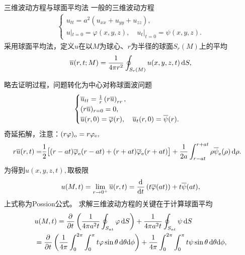 \begin{example}{三维波动方程与球面平均法}{}
	一般的三维波动方程
	\begin{align*}
		\begin{cases}
			u_{tt}=a^2(u_{xx}+u_{yy}+u_{zz}),                     \\
			u|_{t=0}=\varphi(x,y,z),\quad u_t|_{t=0}=\psi(x,y,z).
		\end{cases}
	\end{align*}
	采用球面平均法，定义$u$在以$M$为球心、$r$为半径的球面$S_r(M)$上的平均
	\[
		\overline u(r,t;M)=\frac1{4\pi r^2}\oint_{S_r(M)}u(x,y,z,t)\mathop{}\!\mathrm{d} S,
	\]
	
	略去证明过程，问题转化为中心对称球面波问题
	\begin{align*}
		\begin{cases}
			\overline u_{tt}=\frac1r\left(r\overline u\right)_{rr},                                \\
			(r\overline u)_{r=0}=0,                                                        \\
			\overline u(r,0)=\overline\varphi(r),\quad\overline u_t(r,0)=\overline\psi(r).
		\end{cases}
	\end{align*}
	奇延拓解，注意：$(r\varphi)_\mathrm o=r\varphi_\mathrm e,$
	\begin{align*}
		r\overline u(r,t)= & \frac12\bigl[(r-at)\overline\varphi_\mathrm e(r-at)+(r+at)\overline\varphi_\mathrm e(r+at)\bigr]+\frac1{2a}\int_{r-at}^{r+at}\rho\overline\psi_\mathrm e(\rho)\mathop{}\!\mathrm{d}\rho.
	\end{align*}
	为得到$u(x,y,z,t),$取极限
	\begin{align*}
		u(M,t)=\lim_{r\to 0^+}\overline u(r,t)
		=\frac{\mathrm{d}^{{}}}{\mathrm{d}{t}^{{}}}\left(t\overline\varphi(at)\right)+t\overline\psi(at),
	\end{align*}
	上式称为Possion公式。
	\tcblower
	求解三维波动方程的关键在于计算球面平均
	\begin{align}\label{3D-Wave}
		&u(M,t)  =\frac{\partial^{{}}}{\partial{t}^{{}}}\left(\frac1{4\pi a^2t}\oint_{S_{at}}\varphi\mathop{}\!\mathrm{d} S\right)+\frac1{4\pi a^2t}\oint_{S_{at}}\psi\mathop{}\!\mathrm{d} S\\\notag
		& =\frac{\partial^{{}}}{\partial{t}^{{}}}\left(\frac1{4\pi}\int_0^{2\pi}\int_0^\pi t\varphi\sin\theta\mathop{}\!\mathrm{d}\theta\mathrm{d}\phi\right)+\frac1{4\pi}\int_0^{2\pi}\int_0^\pi t\psi\sin\theta\mathop{}\!\mathrm{d}\theta\mathrm{d}\phi,
	\end{align}
\end{example}

